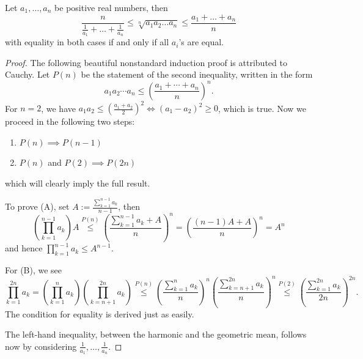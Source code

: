 \begin{theorem}
  \label{ch20theoremIIproof1}
  \leanok
  Let $a_1, \dots, a_n$ be positive real numbers, then
  \[
  \frac{n}{\frac{1}{a_1}+\dots+\frac{1}{a_n}} \le
    \sqrt[n]{a_1a_2\dots a_n} \le
    \frac{a_1+\dots+ a_n}{n}
  \]
 with equality in both cases if and only if all $a_i$'s are equal.
\end{theorem}
 \begin{proof}
  \leanok
  The following beautiful nonstandard induction proof is attributed to Cauchy.
  Let $P(n)$ be the statement of the second inequality, written in the form
  \[
  a_1 a_2 \cdots a_n \le \left(\frac{a_1 + \cdots + a_n}{n}\right)^n.
  \]
  For $n=2$, we have $a_1 a_2 \le \left(\frac{a_1+a_2}{2}\right)^2 \iff (a_1-a_2)^2 \ge 0$, which is true.
  Now we proceed in the following two steps:
  \begin{enumerate}
    \item[(A)] $P(n) \implies P(n-1)$
    \item[(B)] $P(n)$ and $P(2) \implies P(2n)$
  \end{enumerate}
  which will clearly imply the full result.

  To prove (A), set $A := \frac{\sum_{k=1}^{n-1} a_k}{n-1}$, then
  \[
  \left(\prod_{k=1}^{n-1} a_k\right) A \stackrel{P(n)}{\le} \left(\frac{\sum_{k=1}^{n-1} a_k + A}{n}\right)^n = \left(\frac{(n-1)A + A}{n}\right)^n = A^n
  \]
  and hence $\prod_{k=1}^{n-1} a_k \le A^{n-1}$.

  For (B), we see
  \[
  \prod_{k=1}^{2n} a_k = \left(\prod_{k=1}^{n} a_k\right)\left(\prod_{k=n+1}^{2n} a_k\right)
  \stackrel{P(n)}{\le} \left(\frac{\sum_{k=1}^{n} a_k}{n}\right)^n \left(\frac{\sum_{k=n+1}^{2n} a_k}{n}\right)^n
  \stackrel{P(2)}{\le} \left(\frac{\sum_{k=1}^{2n} a_k}{2n}\right)^{2n}.
  \]
  The condition for equality is derived just as easily.

  The left-hand inequality, between the harmonic and the geometric mean,
  follows now by considering $\frac{1}{a_1}, \dots, \frac{1}{a_n}$.
\end{proof}

